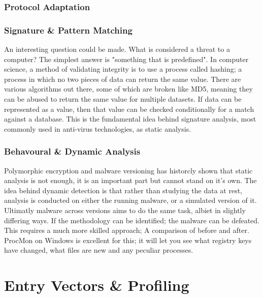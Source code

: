 \subsection{Protocol Adaptation}
\subsection{Signature \& Pattern Matching}
An interesting question could be made. What is considered a threat to a computer? The simplest answer is "something that is predefined". 
In computer science, a method of validating integrity is to use a process called hashing; a process in which no two pieces of data can return the same value. 
There are various algorithms out there, some of which are broken like MD5, meaning they can be abused to return the same value for multiple datasets. 
If data can be represented as a value, then that value can be checked conditionally for a match against a database. This is the fundamental idea behind signature analysis,
most commonly used in anti-virus technologies, as static analysis.


\subsection{Behavoural & Dynamic Analysis}
Polymorphic encryption and malware versioning has historcly shown that static analysis is not enough, it is an important part but cannot stand on it's own. The idea behind dynamic detection is that rather than
studying the data at rest, analysis is conducted on either the running malware, or a simulated version of it. Ultimatly malware across versions aims to do the same task, albiet in slightly differing ways. If the methodology
can be identified; the malware can be defeated. This requires a much more skilled approach; A comparison of before and after. ProcMon on Windows is excellent for this; it will let you see what registry keys have changed, what files are new and any peculiar processes.




\chapter{Entry Vectors \& Profiling}
